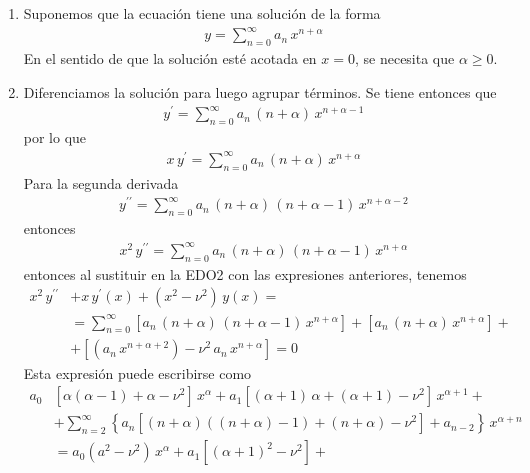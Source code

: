 \begin{enumerate}[label=\textbf{Paso \arabic*}.]
\item Suponemos que la ecuación tiene una solución de la forma
\begin{align*}
y = \sum_{n=0}^{\infty} a_{n} \, x^{n+\alpha}
\end{align*}
En el sentido de que la solución esté acotada en $x = 0$, se necesita que $\alpha \geq 0$.
\item Diferenciamos la solución para luego agrupar términos. Se tiene entonces que
\begin{align*}
y^{\prime} = \sum_{n=0}^{\infty} a_{n} \, (n + \alpha) \, x^{n+\alpha-1}
\end{align*}
por lo que
\begin{align*}
x \, y^{\prime} = \sum_{n=0}^{\infty} a_{n} \, (n + \alpha) \, x^{n+\alpha}
\end{align*}
Para la segunda derivada
\begin{align*}
y^{\prime \prime} = \sum_{n=0}^{\infty} a_{n} \, (n + \alpha) \, (n + \alpha - 1) \, x^{n+\alpha-2}
\end{align*}
entonces
\begin{align*}
x^{2} \, y^{\prime \prime} = \sum_{n=0}^{\infty} a_{n} \, (n + \alpha) \, (n + \alpha - 1) \, x^{n + \alpha}
\end{align*}
entonces al sustituir en la EDO2 con las expresiones anteriores, tenemos
\begin{align*}
x^{2} \, y^{\prime \prime} &+  x \, y^{\prime} (x) + (x^{2} - \nu^{2}) \, y(x) = \\
&= \sum_{n=0}^{\infty}  \left[ a_{n} \, (n + \alpha) \, (n + \alpha - 1) \, x^{n + \alpha} \right] + \left[ a_{n} \, (n + \alpha) \, x^{n+\alpha} \right] + \\
&+  \left[ (a_{n} \, x^{n + \alpha + 2}) - \nu^{2} \, a_{n} \, x^{n + \alpha} \right] = 0
\end{align*}
Esta expresión puede escribirse como
\begin{align*}
a_{0} &\left[ \alpha (\alpha - 1) + \alpha - \nu^{2} \right] \, x^{\alpha} + a_{1} \left[ (\alpha + 1) \, \alpha + (\alpha + 1) - \nu^{2} \right] \, x^{\alpha+1} + \\[0.5em]
&+ \sum_{n=2}^{\infty} \left\{ a_{n} \left[ (n + \alpha)((n + \alpha) - 1) + (n + \alpha) - \nu^{2} \right] + a_{n-2} \right\} \, x^{\alpha + n} \\[0.5em]
&= a_{0} (a^{2} - \nu^{2}) \, x^{\alpha} + a_{1} \left[ (\alpha + 1)^{2} - \nu^{2} \right] + \\[0.5em]

\end{align*}
\end{enumerate}
